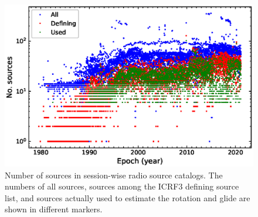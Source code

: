 \documentclass{aa-note}    %
\begin{document}
 \begin{figure}[hbtp]
   \centeringz
   \includegraphics[width=\columnwidth]{figs/num_sou_in_sess}  %
   \caption[]{\label{fig:waterfalls} %
	Number of sources in session-wise radio source catalogs.
	The numbers of all sources, sources among the ICRF3 defining source list, and
	sources actually used to estimate the rotation and glide are shown in different markers.
   }
 \end{figure}
\end{document}
